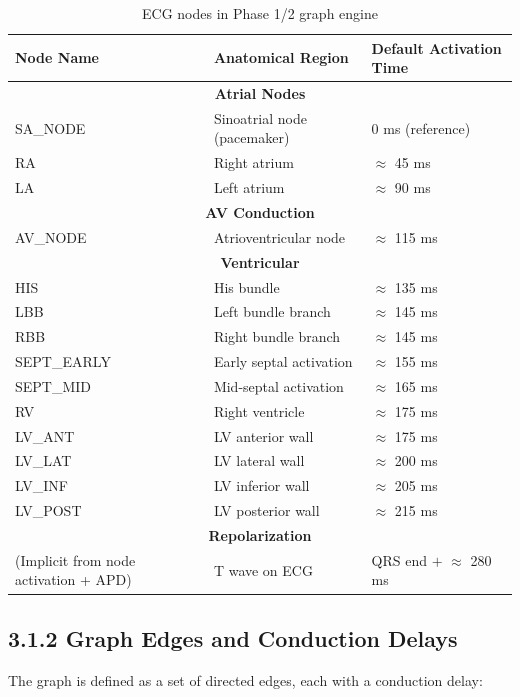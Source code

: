 \documentclass[12pt,oneside,a4paper]{book}
\begin{document}
\begin{table}[H]
\centering
\begin{tabularx}{\textwidth}{|l|X|X|}
\hline
\textbf{Node Name} & \textbf{Anatomical Region} & \textbf{Default Activation Time} \\
\hline
\multicolumn{3}{|c|}{\textbf{Atrial Nodes}} \\
\hline
SA\_NODE & Sinoatrial node (pacemaker) & 0 ms (reference) \\
RA & Right atrium & $\approx$ 45 ms \\
LA & Left atrium & $\approx$ 90 ms \\
\hline
\multicolumn{3}{|c|}{\textbf{AV Conduction}} \\
\hline
AV\_NODE & Atrioventricular node & $\approx$ 115 ms \\
\hline
\multicolumn{3}{|c|}{\textbf{Ventricular}} \\
\hline
HIS & His bundle & $\approx$ 135 ms \\
LBB & Left bundle branch & $\approx$ 145 ms \\
RBB & Right bundle branch & $\approx$ 145 ms \\
SEPT\_EARLY & Early septal activation & $\approx$ 155 ms \\
SEPT\_MID & Mid-septal activation & $\approx$ 165 ms \\
RV & Right ventricle & $\approx$ 175 ms \\
LV\_ANT & LV anterior wall & $\approx$ 175 ms \\
LV\_LAT & LV lateral wall & $\approx$ 200 ms \\
LV\_INF & LV inferior wall & $\approx$ 205 ms \\
LV\_POST & LV posterior wall & $\approx$ 215 ms \\
\hline
\multicolumn{3}{|c|}{\textbf{Repolarization}} \\
\hline
(Implicit from node activation + APD) & T wave on ECG & QRS end $+$ $\approx$ 280 ms \\
\hline
\end{tabularx}
\caption{ECG nodes in Phase 1/2 graph engine}
\label{tab:ecg_nodes}
\end{table}

\subsection{3.1.2 Graph Edges and Conduction Delays}

The graph is defined as a set of directed edges, each with a conduction delay:
\end{document}
